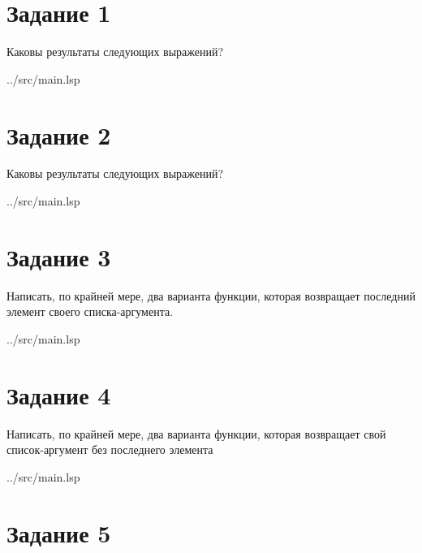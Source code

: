 \section*{Задание 1}

Каковы результаты следующих выражений?

\begin{lstinputlisting}[
	caption={Задание 1},
	label={lst:t1},
	style={lsp},
	linerange={2-6},
	]{../src/main.lsp}
\end{lstinputlisting}

\section*{Задание 2}

Каковы результаты следующих выражений?

\begin{lstinputlisting}[
	caption={Задание 2},
	label={lst:t2},
	style={lsp},
	linerange={10-14},
	]{../src/main.lsp}
\end{lstinputlisting}

\section*{Задание 3}

Написать, по крайней мере, два варианта функции, которая возвращает последний элемент своего списка-аргумента.

\begin{lstinputlisting}[
	caption={Задание 3},
	label={lst:t3},
	style={lsp},
	linerange={17-30},
	]{../src/main.lsp}
\end{lstinputlisting}

\section*{Задание 4}

Написать, по крайней мере, два варианта функции, которая возвращает свой список-аргумент без последнего элемента

\begin{lstinputlisting}[
	caption={Задание 4},
	label={lst:t4},
	style={lsp},
	linerange={32-41},
	]{../src/main.lsp}
\end{lstinputlisting}

\section*{Задание 5}

